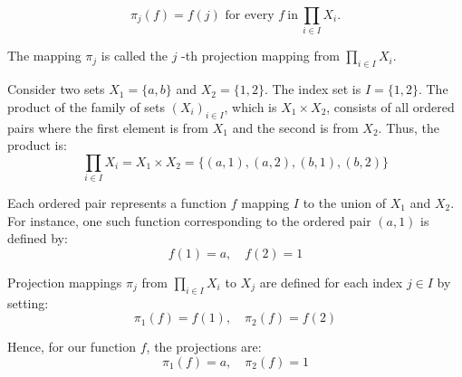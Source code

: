 $$
\pi_j(f)=f(j)\text{ for every }f\mathrm{~in~}\prod_{i\in I}X_i.
$$

The mapping $\pi_j$ is called the $j$ -th projection mapping from $\prod_{i\in I}X_i.$
\begin{example}
	Consider two sets $X_1 = \{a, b\}$ and $X_2 = \{1, 2\}$. The index set is $I = \{1, 2\}$.
	The product of the family of sets $(X_i)_{i \in I}$, which is $X_1 \times X_2$, consists of all ordered pairs where the first element is from $X_1$ and the second is from $X_2$. Thus, the product is:
	\[ \prod_{i \in I} X_i = X_1 \times X_2 = \{(a, 1), (a, 2), (b, 1), (b, 2)\} \]
	
	Each ordered pair represents a function $f$ mapping $I$ to the union of $X_1$ and $X_2$. For instance, one such function corresponding to the ordered pair $(a, 1)$ is defined by:
	\[ f(1) = a, \quad f(2) = 1 \]
	
	Projection mappings $\pi_j$ from $\prod_{i \in I} X_i$ to $X_j$ are defined for each index $j \in I$ by setting:
	\[ \pi_1(f) = f(1), \quad \pi_2(f) = f(2) \]
	
	Hence, for our function $f$, the projections are:
	\[ \pi_1(f) = a, \quad \pi_2(f) = 1 \]
\end{example}

